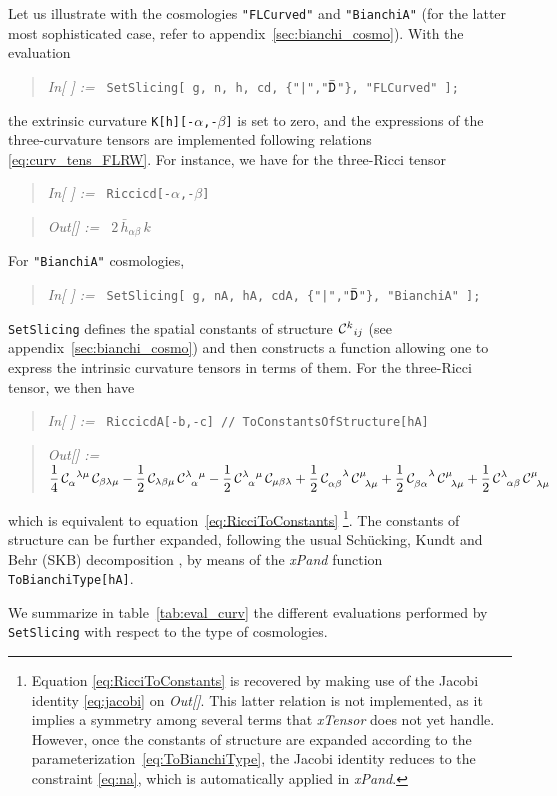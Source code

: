 \documentclass[notitlepage,onecolumn,floatfix,preprintnumbers,aps,prd,showpacs,nofootinbib,amsmath,amssymb,amsfonts]{revtex4-1}
\newcommand{\<}{\langle}
\renewcommand{\>}{\rangle}
\newcounter{inout}
\newcommand{\inoutput}{%
	\stepcounter{inout}%
	\theinout}
\newcommand{\mathIn}[1]{
	\begin{quotation} {\em In[\inoutput] :=\ } {\tt #1} \end{quotation}}
\newcommand{\mathOut}[1]{
	\begin{quotation} {\em Out[\theinout] :=\ } #1 \end{quotation}}
\newcommand{\ttgr}[1]{{#1}}
\newcommand{\bb}{{\ttgr{\alpha}}}
\newcommand{\cc}{{\ttgr{\beta}}}
\newcommand{\ii}{{\ttgr{\mu}}}
\newcommand{\jj}{{\ttgr{\nu}}}
\begin{document}
Let us illustrate with the cosmologies {\tt "FLCurved"} and {\tt "BianchiA"} 
(for the latter most sophisticated case, refer to appendix~\ref{sec:bianchi_cosmo}). 
With the evaluation 
%
\mathIn{SetSlicing[ g, n, h, cd, \{"|","$\bar{\tt D}$"\}, "FLCurved" ];} 
%
the extrinsic curvature {\tt K[h][-$\alpha$,-$\beta$]} is set to zero, and the expressions of the 
three-curvature tensors are implemented following relations \eqref{eq:curv_tens_FLRW}. 
For instance, we have for the three-Ricci tensor
%
\mathIn{Riccicd[-$\alpha$,-$\beta$]}
\mathOut{$2 \, \bar h_{\bb\cc} \, k $}
%
For {\tt "BianchiA"} cosmologies, 
%
\mathIn{SetSlicing[ g, nA, hA, cdA, \{"|","$\bar{\tt D}$"\}, "BianchiA" ];}
%
{\tt SetSlicing} defines the spatial constants of structure ${\cal C}^k{}_{i j}$ (see appendix~\ref{sec:bianchi_cosmo}) 
and then constructs a function allowing one to express the intrinsic curvature tensors in terms of them. 
For the three-Ricci tensor, we then have 
%
\mathIn{RiccicdA[-b,-c] // ToConstantsOfStructure[hA]}
\mathOut{$ \displaystyle 
	\frac{1}{4} \, {\cal C}_{\bb}^{\phantom{\bb} \lambda \ii} \, {\cal C}_{\cc \lambda \ii} - 
	\frac{1}{2} \, {\cal C}_{\lambda \cc \ii} \, {\cal C}^{\lambda \phantom{\bb} \ii}_{\phantom{\ii} \bb} - 
	\frac{1}{2} \, {\cal C}^{\lambda \phantom{\bb} \ii}_{\phantom{\ii} \bb} \, {\cal C}_{\ii \cc \lambda} + 
	\frac{1}{2} \, {\cal C}_{\bb \cc}^{\phantom{\bb \cc} \lambda} \, {\cal C}^\ii_{\phantom{\jj} \lambda \ii} + 
	\frac{1}{2} \, {\cal C}_{\cc \bb}^{\phantom{\cc \bb} \lambda}
        \, {\cal C}^\ii_{\phantom{\jj} \lambda \ii} + 
	\frac{1}{2} \, {\cal C}^{\lambda}_{\phantom{\ii} \bb \cc} \,
        {\cal C}^\ii_{\phantom{\jj} \lambda \ii} $}
%
which is equivalent to equation~\eqref{eq:RicciToConstants} \footnote{%
%
Equation \eqref{eq:RicciToConstants} is recovered by making use of the Jacobi identity \eqref{eq:jacobi} on \textit{Out[\theinout]}. 
This latter relation is not implemented, as it implies a symmetry among several terms that \textit{xTensor} does not yet handle. 
However, once the constants of structure are expanded according to the parameterization~\eqref{eq:ToBianchiType}, 
the Jacobi identity reduces to the constraint \eqref{eq:na}, which is automatically applied in \textit{xPand}.
%
}. 
The constants of structure can be further expanded, following the usual 
Sch\"ucking, Kundt and Behr (SKB) decomposition \cite{1969CMaPh..12..108E}, 
by means of the \textit{xPand} function {\tt ToBianchiType[hA]}. 

We summarize in table~\ref{tab:eval_curv} the different evaluations 
performed by {\tt SetSlicing} with respect to the type of cosmologies. 
\end{document}

